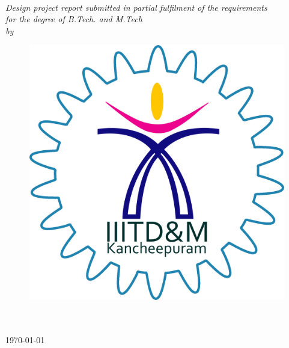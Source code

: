 \documentclass[11pt, a4paper, oneside]{Thesis} %
\begin{document}
\begin{titlepage}
\begin{center}


\vspace{0.4cm} %
{\huge \bfseries \ttitle}\\[0.4cm] %
\vspace{1.5cm} %

 
 \large \textit{Design project report submitted in partial fulfilment of the requirements\\ for the degree of B.Tech. and M.Tech}\\[0.3cm] %
\textit{by}\\[0.4cm]

\authornames

\vfill
\graphicspath{ {./Figures/} }
\begin{figure}[hb]
  \centering
  \includegraphics[width=0.35\linewidth]{iiitdm.png}
\end{figure}

\DEPTNAME\\ %
\textsc{ \UNIVNAME}\\[1.5cm] %
\large \today\\[2cm] %


\end{center}

\end{titlepage}

\end{document}
